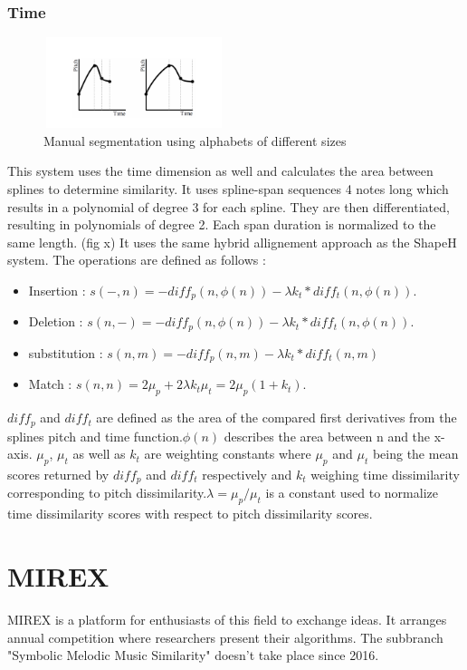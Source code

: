 \documentclass{llncs}
\begin{document}
		\subsubsection{Time}
        \begin{figure}[h!]
			\centering
		  \includegraphics[width=200px,height=100px,keepaspectratio]{two_of_five_point_one}
			\caption{Manual segmentation using alphabets of different sizes \cite{two_point_four}}
        \end{figure}
        This system uses the time dimension as well and calculates the area between splines to determine similarity. It uses spline-span sequences 4 notes long which results in a polynomial of degree 3 for each spline. They are then differentiated, resulting in polynomials of degree 2. Each span duration is normalized to the same length. (fig x)
        It uses the same hybrid allignement approach as the ShapeH system. 
		The operations are defined as follows : 
        \begin{itemize}
         \item Insertion : 
        $ s(-,n) = -diff _p(n, \phi(n)) - \lambda k_t * diff_t(n, \phi(n)).$
        \item Deletion : 
         $s(n,-) = -diff_p(n, \phi(n)) - \lambda k_t * diff_t (n, \phi(n)).$
       \item substitution : 
       $s(n,m) = - diff_p (n,m) - \lambda k_t * diff_t (n,m) $
       \item Match : 
        $s(n,n) = 2\mu_p + 2\lambda k_t \mu_t = 2\mu_p (1+k_t).$
        \end{itemize}
        
        $diff_p$ and $diff_t$ are defined as the area of the compared first derivatives from the splines pitch and time function.$ \phi(n)$ describes the area between n and the x-axis. $\mu_p$, $\mu_t$ as well as $k_t$ are weighting constants where $\mu_p$ and $\mu_t$ being the mean scores returned by $diff_p$ and $diff_t$ respectively and $k_t$ weighing time dissimilarity corresponding to pitch dissimilarity.$ \lambda = \mu_p / \mu_t$ is a constant used to normalize time dissimilarity scores with respect to pitch dissimilarity scores.
	\section{MIREX}
		MIREX is a platform for enthusiasts of this field to exchange ideas. It arranges annual competition where researchers present their algorithms. The subbranch "Symbolic Melodic Music Similarity" doesn't take place since 2016. 
\end{document}
